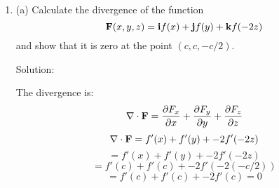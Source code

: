 \documentclass{article}
\begin{document}
\begin{enumerate}
    (b) Divide the above result by the volume of the cube and calculate the limit of the quotient
     as $s \rightarrow 0$. Compare your result with the divergence found in Problem II-14(a).

    Solution:

    The volume is $V = s^3$. Thus:
    \[ \lim_{s\to 0} \frac{1}{\Delta V} \iint_S \bb{F} \cdot \bh{n} dS = \frac{1}{s^3} 2s^3(x_0 + y_0 + z_0) \]
    \[ = 2(x_0 + y_0 + z_0) \]
    The divergence from II-14(a) is:
    \[ \nabla \cdot \bb{F} = 2x + 2y + 2z = 2(x_0 + y_0 + z_0) \]

    (c) Repeat parts (a) and (b) for the function of Problem II-14(b) and (c).

    Solution:

    from II-14(b)
    \[ \bb{F} = \vvec{yz}{xz}{xy} \]
    \[ \bb{F} \cdot \bh{i} = F_x = y_0 z_0 \]
    \[ \bb{F} \cdot -\bh{i} = -F_x = -y_0 z_0 \]
    \centerline{Similar terms for $F_y$ and $F_z$}
    \[ \iint_S \bb{F} \cdot \bh{n} dS = s^2[\bb{F} \cdot \bh{i} + \bb{F} \cdot -\bh{i} + \bb{F} \cdot \bh{j} + \bb{F} \cdot -\bh{j} + \bb{F} \cdot \bh{k} + \bb{F} \cdot -\bh{k}] \]
    \[ = s^2[ y_0 z_0 - y_0 z_0 + x_0 z_0 - x_0 z_0 + x_0 y_0 - x_0 y_0] \]
    \[ = 0 \]
    \[ \implies \frac{1}{\Delta V} \iint_S \bb{F} \cdot \bh{n} dS = 0 \]

    from II-14(c)
    \[ \bb{F} = \vvec{e^{-x}}{e^{-y}}{e^{-z}} \]
    \[ \bb{F} \cdot \bh{i} = F_x = e^{-(x_0 + s/2)} = e^{-x_0}e^{-s/2} \]
    \[ \bb{F} \cdot -\bh{i} = -F_x = -e^{-(x_0 - s/2)} = -e^{-x_0}e^{s/2} \]
    \[ \iint_S \bb{F} \cdot \bh{n} dS = s^2[(e^{-s/2} - e^{s/2})(e^{-x_0} + e^{-y_0} + e^{-z_0})] \]
    \[ \lim_{s\to 0} \frac{1}{\Delta V} \iint_S \bb{F} \cdot \bh{n} dS = \frac{1}{s^3}s^2[(e^{-s/2} - e^{s/2})(e^{-x_0} + e^{-y_0} + e^{-z_0})] \]
    \centerline{Use L'Hopital's rule}
    \[ \lim_{s\to 0} \frac{(e^{-s/2} - e^{s/2})}{s} = \lim_{s\to 0} \frac{(-1/2)e^{-s/2} - (1/2)e^{s/2}}{1} \]
    \[ \lim_{s\to 0} \frac{(e^{-s/2} - e^{s/2})}{s} = (1/2)[-(1) - (1)] = -1 \]
    \[ \implies \lim_{s\to 0} \frac{1}{\Delta V} \iint_S \bb{F} \cdot \bh{n} dS = (-1)(e^{-x_0} + e^{-y_0} + e^{-z_0}) \]
    \[ = e^{-x_0} - e^{-y_0} - e^{-z_0} \]

    \item (a) Calculate the divergence of the function
    \[ \bb{F}(x,y,z) = \vvec{f(x)}{f(y)}{f(-2z)} \]
    and show that it is zero at the point $(c,c,-c/2)$.

    Solution:

    The divergence is:
    \[ \nabla \cdot \bb{F} = \pd[F_x]{x} + \pd[F_y]{y} + \pd[F_z]{z}\]
    \[ \nabla \cdot \bb{F} = f'(x) + f'(y) + -2f'(-2z) \]
    \[ = f'(x) + f'(y) + -2f'(-2z) \]
    \[ = f'(c) + f'(c) + -2f'(-2(-c/2)) \]
    \[ = f'(c) + f'(c) + -2f'(c) = 0 \]


\end{enumerate}
\end{document}
